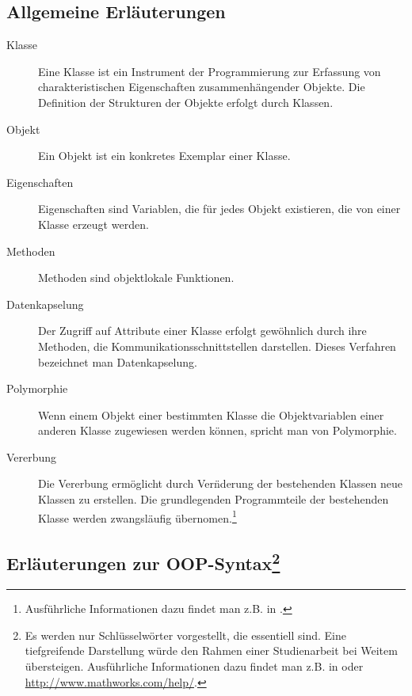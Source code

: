 
\subsection*{Allgemeine Erl\"auterungen}
\begin{description}

	\item[Klasse] Eine Klasse ist ein Instrument der
	Programmierung zur Erfassung von charakteristischen Eigenschaften
	zusammenh\"angender Objekte. Die Definition der Strukturen der Objekte
	erfolgt durch Klassen.

	\item[Objekt] Ein Objekt ist ein konkretes Exemplar einer
	Klasse.

	\item[Eigenschaften] Eigenschaften sind Variablen, die f\"ur jedes
	Objekt existieren, die von einer Klasse erzeugt werden.

	\item[Methoden] Methoden sind objektlokale Funktionen.

	\item[Datenkapselung] Der Zugriff auf Attribute einer Klasse erfolgt
	gew\"ohnlich durch ihre Methoden, die Kommunikationsschnittstellen
	darstellen. Dieses Verfahren bezeichnet man Datenkapselung.

	\item[Polymorphie] Wenn einem Objekt einer bestimmten Klasse die
	Objektvariablen einer anderen Klasse zugewiesen werden k\"onnen, spricht
	man von Polymorphie.

	\item[Vererbung] Die Vererbung erm\"oglicht durch Ver\"nderung der
	bestehenden Klassen neue Klassen zu erstellen. Die grundlegenden
	Programmteile der bestehenden Klasse werden zwangsl\"aufig
	\"ubernomen.\footnote{ Ausf\"uhrliche Informationen dazu findet man z.B.
	in \cite{pepperOOP}.}

\end{description}


\subsection*{Erl\"auterungen zur OOP-Syntax\footnote{ Es werden nur
Schl\"usselw\"orter vorgestellt, die essentiell sind. Eine tiefgreifende
Darstellung w\"urde den Rahmen einer Studienarbeit bei Weitem \"ubersteigen.
Ausf\"uhrliche Informationen dazu findet man z.B. in \cite{matlab_kompakt} oder
\url{http://www.mathworks.com/help/}.}}

